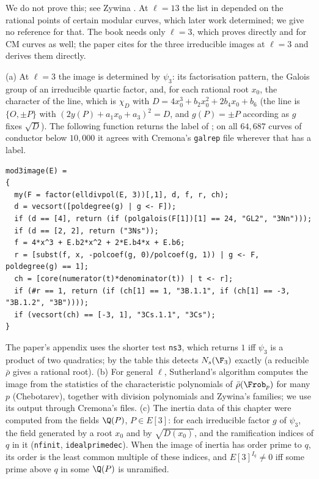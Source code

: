 We do not prove this; see Zywina \cite[Section 1]{Zywina15}. At $\ell=13$ the list in \cite{Zywina15} depended on the rational points of certain modular
curves, which later work determined; we give no reference for that. The book needs only $\ell=3$, which  proves directly
and for CM curves as well; the paper cites \cite{Zywina15} for the three irreducible images at $\ell=3$ and derives them directly.

\begin{remark}\label{rem:galrep:computing-images}
(a) At $\ell=3$ the image is determined by $\psi_3$: its factorisation pattern, the Galois group of an irreducible quartic factor, and, for each
rational root $x_0$, the character of the line, which is $\chi_D$ with $D=4x_0^3+b_2x_0^2+2b_4x_0+b_6$ (the line is $\{O,\pm P\}$ with
$(2y(P)+a_1x_0+a_3)^2=D$, and $g(P)=\pm P$ according as $g$ fixes $\sqrt D$). The following function returns the label of ; on
all $64{,}687$ curves of conductor below $10{,}000$ it agrees with Cremona's \texttt{galrep} file wherever that has a label.
\begin{lstlisting}[language=GP]
mod3image(E) =
{
  my(F = factor(elldivpol(E, 3))[,1], d, f, r, ch);
  d = vecsort([poldegree(g) | g <- F]);
  if (d == [4], return (if (polgalois(F[1])[1] == 24, "GL2", "3Nn")));
  if (d == [2, 2], return ("3Ns"));
  f = 4*x^3 + E.b2*x^2 + 2*E.b4*x + E.b6;
  r = [subst(f, x, -polcoef(g, 0)/polcoef(g, 1)) | g <- F, poldegree(g) == 1];
  ch = [core(numerator(t)*denominator(t)) | t <- r];
  if (#r == 1, return (if (ch[1] == 1, "3B.1.1", if (ch[1] == -3, "3B.1.2", "3B"))));
  if (vecsort(ch) == [-3, 1], "3Cs.1.1", "3Cs");
}
\end{lstlisting}
The paper's appendix uses the shorter test \texttt{ns3}, which returns $1$ iff $\psi_3$ is a product of two quadratics; by the table this detects
$N_s(\F_3)$ exactly (a reducible $\bar\rho$ gives a rational root). (b) For general $\ell$, Sutherland's algorithm \cite{Sutherland16} computes the
image from the statistics of the characteristic polynomials of $\bar\rho(\Frob_p)$ for many $p$ (Chebotarev), together with division polynomials and
Zywina's families; we use its output through Cremona's files. (c) The inertia data of this chapter were computed from the fields $\Q(P)$, $P\in E[3]$:
for each irreducible factor $g$ of $\psi_3$, the field generated by a root $x_0$ and by $\sqrt{D(x_0)}$, and the ramification indices of $q$ in it
(\texttt{nfinit}, \texttt{idealprimedec}). When the image of inertia has order prime to $q$, its order is the least common multiple of these
indices, and $E[3]^{I_q}\ne0$ iff some prime above $q$ in some $\Q(P)$ is unramified.
\end{remark}

